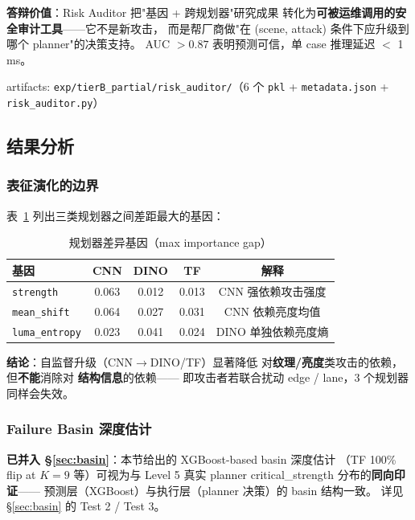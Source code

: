\documentclass[a4paper,12pt,fontset=fandol]{ctexart}
\newcommand{\gene}[1]{\texttt{#1}}
\newcommand{\planner}[1]{\textsf{#1}}
\begin{document}
{\noindent\textbf{答辩价值}：Risk Auditor 把"基因 + 跨规划器"研究成果
转化为\textbf{可被运维调用的安全审计工具}——它不是新攻击，
而是帮厂商做"在 (scene, attack) 条件下应升级到哪个 planner"的决策支持。
AUC $> 0.87$ 表明预测可信，单 case 推理延迟 $<$ 1 ms。

artifacts: \texttt{exp/tierB\_partial/risk\_auditor/}（6 个 \texttt{pkl} + \texttt{metadata.json} + \texttt{risk\_auditor.py}）

\subsection{结果分析}

\subsubsection{表征演化的边界}

表~\ref{tab:gap} 列出三类规划器之间差距最大的基因：

\begin{table}[H]
\centering
\small
\caption{规划器差异基因（max importance gap）}
\label{tab:gap}
\begin{tabular}{lcccc}
\toprule
\textbf{基因} & \planner{CNN} & \planner{DINO} & \planner{TF} & \textbf{解释} \\
\midrule
\gene{strength}      & 0.063 & 0.012 & 0.013 & CNN 强依赖攻击强度 \\
\gene{mean\_shift}    & 0.064 & 0.027 & 0.031 & CNN 依赖亮度均值 \\
\gene{luma\_entropy}  & 0.023 & 0.041 & 0.024 & DINO 单独依赖亮度熵 \\
\bottomrule
\end{tabular}
\end{table}

\noindent\textbf{结论}：自监督升级（CNN$\to$DINO/TF）显著降低
对\textbf{纹理/亮度}类攻击的依赖，但\textbf{不能}消除对
\textbf{结构信息}的依赖——
即攻击者若联合扰动 edge / lane，3 个规划器同样会失效。

\subsubsection{Failure Basin 深度估计}

\noindent\textbf{已并入 \S\ref{sec:basin}}：本节给出的 XGBoost-based basin 深度估计
（TF 100\% flip at $K\!=\!9$ 等）可视为与 Level 5 真实 planner
critical\_strength 分布的\textbf{同向印证}——
预测层（XGBoost）与执行层（planner 决策）的 basin 结构一致。
详见 \S\ref{sec:basin} 的 Test 2 / Test 3。

}
\end{document}
